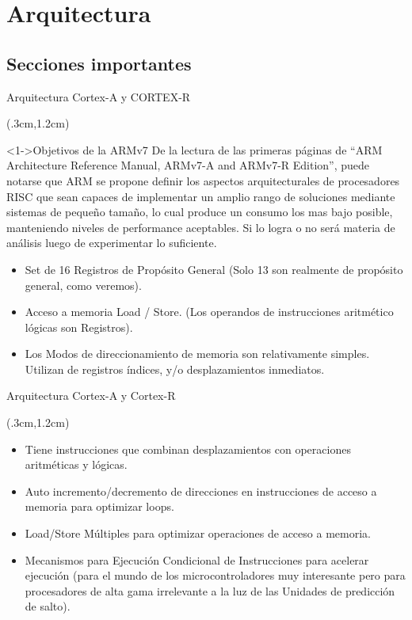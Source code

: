\documentclass[usenames,table,dvipsnames,aspectratio=169]{beamer}
\begin{document}
\section{Arquitectura}
\subsection{Secciones importantes}
\begin{frame}{Arquitectura Cortex-A y CORTEX-R}
 \begin{textblock*}{\textwidth}(.3cm,1.2cm)
  \begin{block}<1->{Objetivos de la ARMv7}
   \justifying De la lectura de las primeras páginas de ``ARM Architecture Reference Manual, ARMv7-A and ARMv7-R Edition'', puede notarse que ARM se propone definir los aspectos arquitecturales de procesadores RISC que sean capaces de implementar un amplio rango de soluciones mediante sistemas de pequeño tamaño, lo cual produce un consumo los mas bajo posible, manteniendo niveles de performance aceptables. Si lo logra o no será materia de análisis luego de experimentar lo suficiente. 
  \end{block}
  \begin{itemize}[<+(1)->] \justifying
   \item Set de 16 Registros de Propósito General (Solo 13 son realmente de propósito general, como veremos).
   \item Acceso a memoria Load / Store. (Los operandos de instrucciones aritmético lógicas son Registros).
   \item Los Modos de direccionamiento de memoria son relativamente simples. Utilizan de registros índices, y/o desplazamientos inmediatos.
  \end{itemize}
 \end{textblock*}
\end{frame}

\begin{frame}{Arquitectura Cortex-A y Cortex-R}
 \begin{textblock*}{\textwidth}(.3cm,1.2cm)
  \begin{itemize}[<+(1)->] \justifying \parskip .4cm
   \item Tiene instrucciones que combinan desplazamientos con operaciones aritméticas y lógicas.
   \item Auto incremento/decremento de direcciones en instrucciones de acceso a memoria para optimizar loops.
   \item Load/Store Múltiples para optimizar operaciones de acceso a memoria.
   \item Mecanismos para Ejecución Condicional de Instrucciones para acelerar ejecución (para el mundo de los microcontroladores muy interesante pero para procesadores de alta gama irrelevante a la luz de las Unidades de predicción de salto).
  \end{itemize}
 \end{textblock*}
\end{frame}
\end{document}
